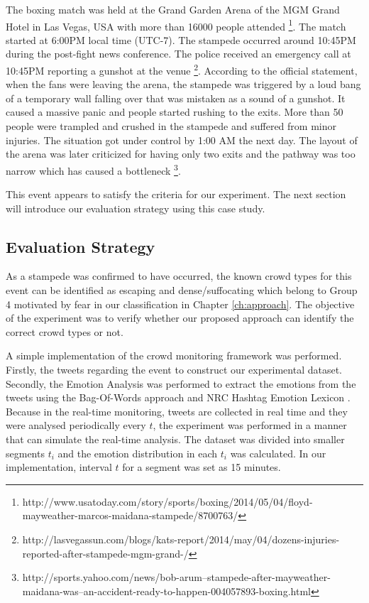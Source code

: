 The boxing match was held at the Grand Garden Arena of the MGM Grand Hotel in Las Vegas, USA with more than 16000 people attended \footnote{http://www.usatoday.com/story/sports/boxing/2014/05/04/floyd-mayweather-marcos-maidana-stampede/8700763/}. The match started at 6:00PM local time (UTC-7). The stampede occurred around 10:45PM during the post-fight news conference. The police received an emergency call at 10:45PM reporting a gunshot at the venue \footnote{http://lasvegassun.com/blogs/kats-report/2014/may/04/dozens-injuries-reported-after-stampede-mgm-grand-/}. According to the official statement, when the fans were leaving the arena, the stampede was triggered by a loud bang of a temporary wall falling over that was mistaken as a sound of a gunshot. It caused a massive panic and people started rushing to the exits. More than 50 people were trampled and crushed in the stampede and suffered from minor injuries. The situation got under control by 1:00 AM the next day. The layout of the arena was later criticized for having only two exits and the pathway was too narrow which has caused a bottleneck \footnote{http://sports.yahoo.com/news/bob-arum--stampede-after-mayweather-maidana-was--an-accident-ready-to-happen-004057893-boxing.html}.

This event appears to satisfy the criteria for our experiment. The next section will introduce our evaluation strategy using this case study.

\subsection{Evaluation Strategy}

As a stampede was confirmed to have occurred, the known crowd types for this event can be identified as escaping and dense/suffocating which belong to Group 4 motivated by fear in our classification in Chapter \ref{ch:approach}. The objective of the experiment was to verify whether our proposed approach can identify the correct crowd types or not.

A simple implementation of the crowd monitoring framework was performed. Firstly, the tweets regarding the event to construct our experimental dataset. Secondly, the Emotion Analysis was performed to extract the emotions from the tweets using the Bag-Of-Words approach and NRC Hashtag Emotion Lexicon \citep{mohammad2014using}. Because in the real-time monitoring, tweets are collected in real time and they were analysed periodically every \(t\), the experiment was performed in a manner that can simulate the real-time analysis. The dataset was divided into smaller segments \(t_i\) and the emotion distribution in each \(t_i\) was calculated. In our implementation, interval \(t\) for a segment was set as 15 minutes.

